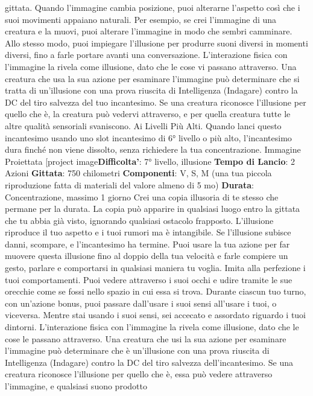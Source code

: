 \begin{multicols}{2}
gittata. Quando l’immagine cambia posizione, puoi
alterarne l’aspetto così che i suoi movimenti appaiano
naturali. Per esempio, se crei l’immagine di una
creatura e la muovi, puoi alterare l’immagine in modo
che sembri camminare. Allo stesso modo, puoi
impiegare l’illusione per produrre suoni diversi in
momenti diversi, fino a farle portare avanti una
conversazione.
L’interazione fisica con l’immagine la rivela come
illusione, dato che le cose vi passano attraverso. Una
creatura che usa la sua azione per esaminare
l’immagine può determinare che si tratta di un’illusione
con una prova riuscita di Intelligenza (Indagare) contro
la DC del tiro salvezza del tuo incantesimo. Se una
creatura riconosce l’illusione per quello che è, la
creatura può vedervi attraverso, e per quella creatura
tutte le altre qualità sensoriali svaniscono.
Ai Livelli Più Alti. Quando lanci questo incantesimo
usando uno slot incantesimo di 6° livello o più alto,
l’incantesimo dura finché non viene dissolto, senza
richiedere la tua concentrazione.
Immagine Proiettata
[project image\textbf{Difficolta'}:
7° livello, illusione
\textbf{Tempo di Lancio}: 2 Azioni
\textbf{Gittata}: 750 chilometri
\textbf{Componenti}: V, S, M (una tua piccola riproduzione
fatta di materiali del valore almeno di 5 mo)
\textbf{Durata}: Concentrazione, massimo 1 giorno
Crei una copia illusoria di te stesso che permane per la
durata. La copia può apparire in qualsiasi luogo entro la
gittata che tu abbia già visto, ignorando qualsiasi
ostacolo frapposto. L’illusione riproduce il tuo aspetto e
i tuoi rumori ma è intangibile. Se l’illusione subisce
danni, scompare, e l’incantesimo ha termine.
Puoi usare la tua azione per far muovere questa
illusione fino al doppio della tua velocità e farle
compiere un gesto, parlare e comportarsi in qualsiasi
maniera tu voglia. Imita alla perfezione i tuoi
comportamenti.
Puoi vedere attraverso i suoi occhi e udire tramite le
sue orecchie come se fossi nello spazio in cui essa si
trova. Durante ciascun tuo turno, con un’azione bonus,
puoi passare dall’usare i suoi sensi all’usare i tuoi, o
viceversa. Mentre stai usando i suoi sensi, sei accecato
e assordato riguardo i tuoi dintorni.
L’interazione fisica con l’immagine la rivela come
illusione, dato che le cose le passano attraverso. Una
creatura che usi la sua azione per esaminare
l’immagine può determinare che è un’illusione con una
prova riuscita di Intelligenza (Indagare) contro la DC del
tiro salvezza dell’incantesimo. Se una creatura
riconosce l’illusione per quello che è, essa può vedere
attraverso l’immagine, e qualsiasi suono prodotto

\end{multicols}
